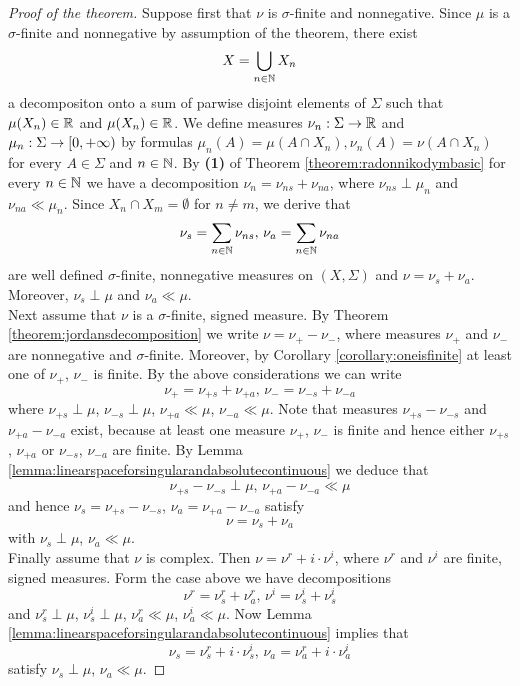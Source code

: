 \begin{proof}[Proof of the theorem]
Suppose first that $\nu$ is $\sigma$-finite and nonnegative. Since $\mu$ is a $\sigma$-finite and nonnegative by assumption of the theorem, there exist
$$X = \bigcup_{n\in {\mathbb N}}X_n$$
a decompositon onto a sum of parwise disjoint elements of $\Sigma$ such that $\mu(X_n)\in {\mathbb R}$ and $\mu(X_n)\in {\mathbb R}$. We define measures $\nu_n:\Sigma \rightarrow {\mathbb R}$ and $\mu_n:\Sigma \rightarrow [0,+\infty)$ by formulas $\mu_n(A) = \mu(A\cap X_n), \nu_n(A) = \nu(A\cap X_n)$ for every $A\in \Sigma$ and $n\in {\mathbb N}$. By \textbf{(1)} of Theorem \ref{theorem:radonnikodymbasic} for every $n\in {\mathbb N}$ we have a decomposition $\nu_n = \nu_{ns}+\nu_{na}$, where $\nu_{ns} \perp \mu_n$ and $\nu_{na} \ll \mu_n$. Since $X_n\cap X_m = \emptyset$ for $n\neq m$, we derive that 
$$\nu_s = \sum_{n\in {\mathbb N}}\nu_{ns},\,\nu_{a}=\sum_{n\in {\mathbb N}}\nu_{na}$$
are well defined $\sigma$-finite, nonnegative measures on $(X, \Sigma)$ and $\nu = \nu_s + \nu_a$. Moreover, $\nu_s \perp \mu$ and $\nu_a \ll \mu$.\\
Next assume that $\nu$ is a $\sigma$-finite, signed measure. By Theorem \ref{theorem:jordansdecomposition} we write $\nu = \nu_+-\nu_-$, where measures $\nu_+$ and $\nu_-$ are nonnegative and $\sigma$-finite. Moreover, by Corollary \ref{corollary:oneisfinite} at least one of $\nu_+$, $\nu_-$ is finite. By the above considerations we can write
$$\nu_+ = \nu_{+s}+\nu_{+a},\,\nu_- = \nu_{-s}+\nu_{-a}$$
where $\nu_{+s}\perp \mu$, $\nu_{-s}\perp \mu$, $\nu_{+a}\ll \mu$, $\nu_{-a} \ll \mu$. Note that measures $\nu_{+s}-\nu_{-s}$ and $\nu_{+a}-\nu_{-a}$ exist, because at least one measure $\nu_+$, $\nu_-$ is finite and hence either $\nu_{+s}$, $\nu_{+a}$ or $\nu_{-s}$, $\nu_{-a}$ are finite. By Lemma \ref{lemma:linearspaceforsingularandabsolutecontinuous} we deduce that 
$$\nu_{+s}-\nu_{-s} \perp \mu,\,\nu_{+a}-\nu_{-a} \ll \mu$$
and hence $\nu_s = \nu_{+s}-\nu_{-s}$, $\nu_{a} = \nu_{+a}-\nu_{-a}$ satisfy 
$$\nu = \nu_s+\nu_a$$
with $\nu_s \perp \mu$, $\nu_a \ll \mu$.\\
Finally assume that $\nu$ is complex. Then $\nu = \nu^r+i\cdot \nu^i$, where $\nu^r$ and $\nu^i$ are finite, signed measures. Form the case above we have decompositions
$$\nu^r = \nu^r_s+\nu^r_a,\,\nu^i=\nu^i_s+\nu^i_s$$
and $\nu^r_s \perp \mu$, $\nu^i_s \perp \mu$, $\nu^r_a \ll\mu$, $\nu^i_a \ll \mu$. Now Lemma \ref{lemma:linearspaceforsingularandabsolutecontinuous} implies that 
$$\nu_s = \nu^r_s+i\cdot \nu^i_s,\,\nu_a = \nu^r_a+i\cdot \nu^i_a$$
satisfy $\nu_s \perp \mu$, $\nu_a \ll \mu$.
\end{proof}

